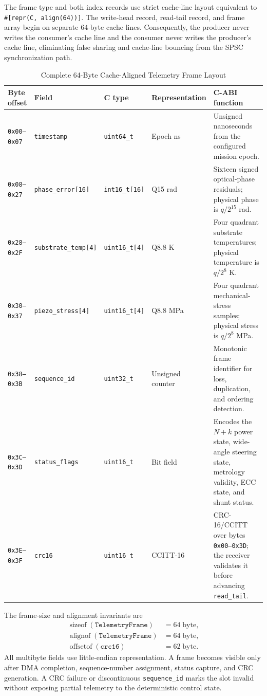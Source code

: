 \documentclass[10pt,twocolumn]{IEEEtran}
\begin{document}
The frame type and both index records use strict cache-line layout equivalent
to \texttt{\#[repr(C, align(64))]}.  The write-head record, read-tail record,
and frame array begin on separate $64$-byte cache lines.  Consequently, the
producer never writes the consumer's cache line and the consumer never writes
the producer's cache line, eliminating false sharing and cache-line bouncing
from the SPSC synchronization path.

\begin{table}[t]
\caption{Complete 64-Byte Cache-Aligned Telemetry Frame Layout}
\label{tab:telemetry_frame_layout}
\centering
\footnotesize
\begin{tabular}{@{}llllp{7.25cm}@{}}
\toprule
Byte offset & Field & C type & Representation & C-ABI function \\
\midrule
\texttt{0x00--0x07} & \texttt{timestamp} & \texttt{uint64\_t} & Epoch ns & Unsigned nanoseconds from the configured mission epoch. \\
\texttt{0x08--0x27} & \texttt{phase\_error[16]} & \texttt{int16\_t[16]} & Q15 rad & Sixteen signed optical-phase residuals; physical phase is $q/2^{15}$ rad. \\
\texttt{0x28--0x2F} & \texttt{substrate\_temp[4]} & \texttt{uint16\_t[4]} & Q8.8 K & Four quadrant substrate temperatures; physical temperature is $q/2^8$ K. \\
\texttt{0x30--0x37} & \texttt{piezo\_stress[4]} & \texttt{uint16\_t[4]} & Q8.8 MPa & Four quadrant mechanical-stress samples; physical stress is $q/2^8$ MPa. \\
\texttt{0x38--0x3B} & \texttt{sequence\_id} & \texttt{uint32\_t} & Unsigned counter & Monotonic frame identifier for loss, duplication, and ordering detection. \\
\texttt{0x3C--0x3D} & \texttt{status\_flags} & \texttt{uint16\_t} & Bit field & Encodes the $N+k$ power state, wide-angle steering state, metrology validity, ECC state, and shunt status. \\
\texttt{0x3E--0x3F} & \texttt{crc16} & \texttt{uint16\_t} & CCITT-16 & CRC-16/CCITT over bytes \texttt{0x00--0x3D}; the receiver validates it before advancing \texttt{read\_tail}. \\
\bottomrule
\end{tabular}
\end{table}

The frame-size and alignment invariants are
\begin{equation}
\begin{aligned}
\operatorname{sizeof}(\texttt{TelemetryFrame})&=64\;\mathrm{byte}, \\
\operatorname{alignof}(\texttt{TelemetryFrame})&=64\;\mathrm{byte}, \\
\operatorname{offsetof}(\texttt{crc16})&=62\;\mathrm{byte}.
\end{aligned}
\label{eq:telemetry_abi_invariants}
\end{equation}
All multibyte fields use little-endian representation.  A frame becomes visible
only after DMA completion, sequence-number assignment, status capture, and CRC
generation.  A CRC failure or discontinuous
\texttt{sequence\_id} marks the slot invalid without exposing partial telemetry
to the deterministic control state.
\end{document}
